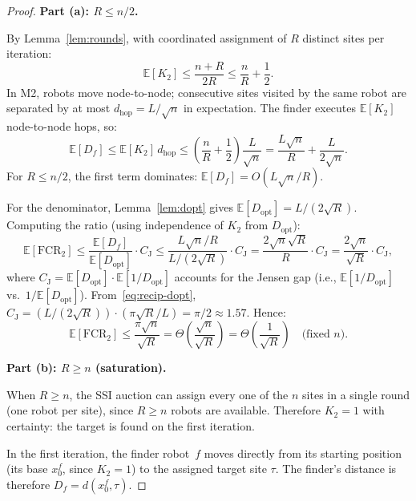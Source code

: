 \begin{proof}
\textbf{Part (a): $R \leq n/2$.}

By Lemma~\ref{lem:rounds}, with coordinated assignment of $R$ distinct
sites per iteration:
\begin{equation}
  \mathbb{E}[K_2] \leq \frac{n+R}{2R} \leq \frac{n}{R} + \frac{1}{2}.
\end{equation}
In M2, robots move node-to-node; consecutive sites visited by the same
robot are separated by at most $d_{\mathrm{hop}} = L/\sqrt{n}$ in
expectation.
The finder executes $\mathbb{E}[K_2]$ node-to-node hops, so:
\begin{equation}
  \mathbb{E}[D_f] \leq \mathbb{E}[K_2]\,d_{\mathrm{hop}}
  \leq \left(\frac{n}{R}+\frac{1}{2}\right)\frac{L}{\sqrt{n}}
  = \frac{L\sqrt{n}}{R} + \frac{L}{2\sqrt{n}}.
\end{equation}
For $R \leq n/2$, the first term dominates:
$\mathbb{E}[D_f] = O(L\sqrt{n}/R)$.

For the denominator, Lemma~\ref{lem:dopt} gives
$\mathbb{E}[D_{\mathrm{opt}}] = L/(2\sqrt{R})$.
Computing the ratio (using independence of $K_2$ from $D_{\mathrm{opt}}$):
\begin{equation}
  \mathbb{E}[\mathrm{FCR}_2]
  \leq \frac{\mathbb{E}[D_f]}{\mathbb{E}[D_{\mathrm{opt}}]}
  \cdot C_{\mathrm{J}}
  \leq \frac{L\sqrt{n}/R}{L/(2\sqrt{R})} \cdot C_{\mathrm{J}}
  = \frac{2\sqrt{n}\sqrt{R}}{R}\cdot C_{\mathrm{J}}
  = \frac{2\sqrt{n}}{\sqrt{R}} \cdot C_{\mathrm{J}},
\end{equation}
where $C_{\mathrm{J}} = \mathbb{E}[D_{\mathrm{opt}}]\cdot\mathbb{E}[1/D_{\mathrm{opt}}]$
accounts for the Jensen gap (i.e., $\mathbb{E}[1/D_{\mathrm{opt}}]$ vs.\
$1/\mathbb{E}[D_{\mathrm{opt}}]$).
From~\eqref{eq:recip-dopt}, $C_{\mathrm{J}} = (L/(2\sqrt{R})) \cdot
(\pi\sqrt{R}/L) = \pi/2 \approx 1.57$.
Hence:
\begin{equation}
  \mathbb{E}[\mathrm{FCR}_2]
  \leq \frac{\pi\sqrt{n}}{\sqrt{R}}
  = \Theta\!\left(\frac{\sqrt{n}}{\sqrt{R}}\right)
  = \Theta\!\left(\frac{1}{\sqrt{R}}\right) \quad \text{(fixed } n\text{)}.
\end{equation}

\textbf{Part (b): $R \geq n$ (saturation).}

When $R \geq n$, the SSI auction can assign every one of the $n$ sites
in a single round (one robot per site), since $R \geq n$ robots are
available.
Therefore $K_2 = 1$ with certainty: the target is found on the first
iteration.

In the first iteration, the finder robot~$f$ moves directly from its
starting position (its base $x_0^f$, since $K_2=1$) to the assigned
target site $\tau$.
The finder's distance is therefore $D_f = d(x_0^f, \tau)$.


\end{proof}
